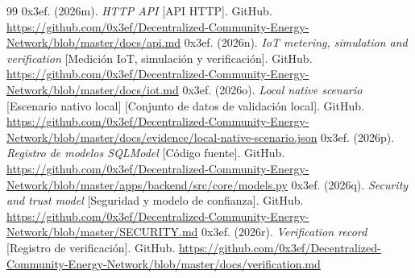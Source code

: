 \begin{thebibliography}{99}
 0x3ef. (2026m). \textit{HTTP API} [API HTTP]. GitHub. \url{https://github.com/0x3ef/Decentralized-Community-Energy-Network/blob/master/docs/api.md}
 0x3ef. (2026n). \textit{IoT metering, simulation and verification} [Medición IoT, simulación y verificación]. GitHub. \url{https://github.com/0x3ef/Decentralized-Community-Energy-Network/blob/master/docs/iot.md}
 0x3ef. (2026o). \textit{Local native scenario} [Escenario nativo local] [Conjunto de datos de validación local]. GitHub. \url{https://github.com/0x3ef/Decentralized-Community-Energy-Network/blob/master/docs/evidence/local-native-scenario.json}
 0x3ef. (2026p). \textit{Registro de modelos SQLModel} [Código fuente]. GitHub. \url{https://github.com/0x3ef/Decentralized-Community-Energy-Network/blob/master/apps/backend/src/core/models.py}
 0x3ef. (2026q). \textit{Security and trust model} [Seguridad y modelo de confianza]. GitHub. \url{https://github.com/0x3ef/Decentralized-Community-Energy-Network/blob/master/SECURITY.md}
 0x3ef. (2026r). \textit{Verification record} [Registro de verificación]. GitHub. \url{https://github.com/0x3ef/Decentralized-Community-Energy-Network/blob/master/docs/verification.md}
\end{thebibliography}
